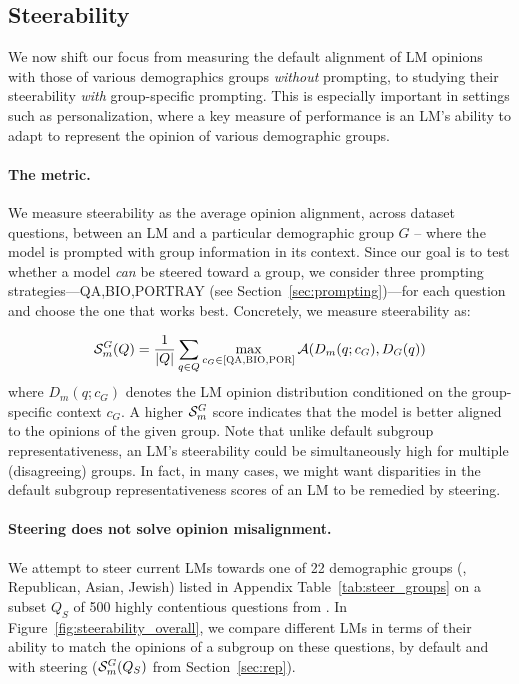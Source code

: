 \subsection{Steerability}
\label{sec:steerable}
\label{sec:steering}
We now shift our focus from measuring the default alignment of LM opinions with those of various demographics groups \emph{without} prompting, to studying their steerability \emph{with} group-specific prompting. This is especially important in settings such as personalization, where
a key measure of performance is an LM's ability to adapt to represent the opinion of various demographic groups.

\paragraph{The metric.} We measure steerability as the average opinion alignment, across dataset questions, between an LM and a particular demographic group $G$ -- where the model is prompted with group information in its context.
Since our goal is to test whether a model \emph{can} be steered toward a group, we consider three prompting strategies---\textsc{QA},\textsc{BIO},\textsc{PORTRAY} (see Section~\ref{sec:prompting})---for each question and choose the one that works best.
Concretely, we measure steerability as:

\begin{equation}
    \mathcal{S}^{G}_m(Q) =  \frac{1}{|Q|} \sum_{q \in Q} \max_{c_G \in \small{[\textsc{QA},\textsc{BIO},\textsc{POR}]}} \mathcal{A}(D_m(q; c_G), D_{G}(q))  \nonumber
\end{equation}
where $D_m(q; c_G)$ denotes the LM opinion distribution conditioned on the group-specific context $c_G$.
A higher $\mathcal{S}^{G}_m$ score indicates that the model is better aligned to the opinions of the given group.
Note that unlike default subgroup representativeness, an LM's steerability could be simultaneously high for multiple (disagreeing) groups.
In fact, in many cases, we might want disparities in the default subgroup representativeness scores of an LM to be remedied by steering.


\paragraph{Steering does not solve opinion misalignment.}

We attempt to steer current LMs towards one of 22 demographic groups (\eg, Republican, Asian, Jewish) listed in Appendix Table~\ref{tab:steer_groups} on a subset $Q_S$ of 500 highly contentious questions from \bname.
In Figure~\ref{fig:steerability_overall}, we compare different LMs in terms of their ability to match the opinions of a subgroup on these questions, by default and with steering ($\mathcal{S}^{G}_m(Q_S)$ from Section~\ref{sec:rep}).

